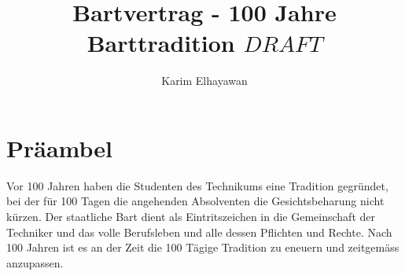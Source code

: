\documentclass[fontsize=12pt,parskip=half]{scrartcl}
\author{Karim Elhayawan}
\begin{document}
\title{Bartvertrag - 100 Jahre Barttradition \(DRAFT\)}
\maketitle


\section*{Präambel}
Vor 100 Jahren haben die Studenten des Technikums eine Tradition gegründet, bei der für 100 Tagen die angehenden Absolventen die Gesichtsbeharung nicht kürzen.
Der staatliche Bart dient als Eintritszeichen in die Gemeinschaft der Techniker und das volle Berufsleben und alle dessen Pflichten und Rechte.
Nach 100 Jahren ist es an der Zeit die 100 Tägige Tradition zu eneuern und zeitgemäss anzupassen.
\end{document}
